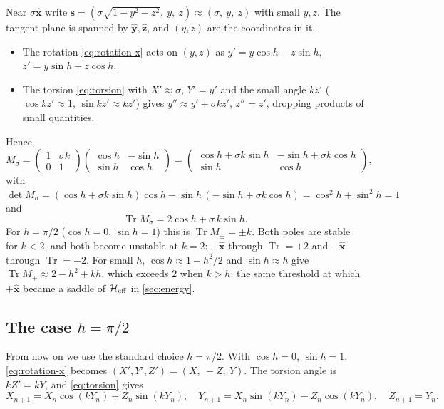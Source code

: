 \documentclass[11pt,a4paper]{article}
\newcommand{\vs}{\bm{s}}
\newcommand{\Tr}{\operatorname{Tr}}
\begin{document}
Near $\sigma\hat{\bm x}$ write $\vs = (\sigma\sqrt{1-y^2-z^2},\ y,\ z) \approx (\sigma,\ y,\ z)$ with small $y, z$. The
tangent plane is spanned by $\hat{\bm y}, \hat{\bm z}$, and $(y, z)$ are the coordinates in it.
\begin{itemize}
  \item The rotation \eqref{eq:rotation-x} acts on $(y,z)$ as $y' = y\cos h - z\sin h$, $z' = y\sin h + z\cos h$.
  \item The torsion \eqref{eq:torsion} with $X' \approx \sigma$, $Y' = y'$ and the small angle $kz'$
  ($\cos kz'\approx1$, $\sin kz'\approx kz'$) gives $y'' \approx y' + \sigma kz'$, $z'' = z'$, dropping products of small
  quantities.
\end{itemize}
Hence
\begin{equation}
  M_\sigma = \begin{pmatrix}1 & \sigma k\\ 0 & 1\end{pmatrix}\begin{pmatrix}\cos h & -\sin h\\ \sin h & \cos h\end{pmatrix}
           = \begin{pmatrix} \cos h + \sigma k \sin h & -\sin h + \sigma k\cos h\\ \sin h & \cos h\end{pmatrix},
\end{equation}
with $\det M_\sigma = (\cos h + \sigma k\sin h)\cos h - \sin h\,(-\sin h + \sigma k\cos h) = \cos^2h + \sin^2h = 1$ and
\begin{equation}\label{eq:pole-trace}
  \boxed{\Tr M_\sigma = 2\cos h + \sigma\, k \sin h .}
\end{equation}
For $h = \pi/2$ ($\cos h = 0$, $\sin h = 1$) this is $\Tr M_\pm = \pm k$. Both poles are stable for $k<2$, and both
become unstable at $k = 2$: $+\hat{\bm x}$ through $\Tr = +2$ and $-\hat{\bm x}$ through $\Tr = -2$. For small $h$,
$\cos h \approx 1 - h^2/2$ and $\sin h \approx h$ give $\Tr M_+ \approx 2 - h^2 + kh$, which exceeds $2$ when $k > h$:
the same threshold at which $+\hat{\bm x}$ became a saddle of $\mathcal H_{\rm eff}$ in \cref{sec:energy}.

\subsection{The case \texorpdfstring{$h = \pi/2$}{h = pi/2}}\label{sec:pi2}

From now on we use the standard choice $h = \pi/2$. With $\cos h = 0$, $\sin h = 1$, \eqref{eq:rotation-x} becomes
$(X', Y', Z') = (X,\ -Z,\ Y)$. The torsion angle is $kZ' = kY$, and \eqref{eq:torsion} gives
\begin{equation}\label{eq:map-pi2}
  X_{n+1} = X_n\cos(kY_n) + Z_n\sin(kY_n), \quad
  Y_{n+1} = X_n\sin(kY_n) - Z_n\cos(kY_n), \quad
  Z_{n+1} = Y_n .
\end{equation}
\end{document}
